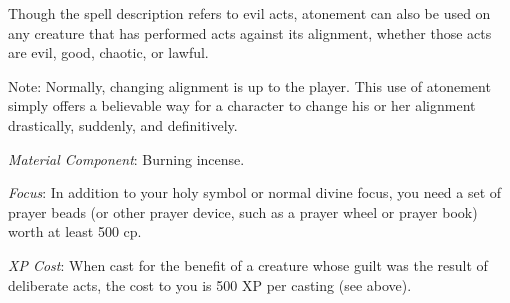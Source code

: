 {	Though the spell description refers to evil acts, atonement can also be used on any creature that has performed acts against its alignment, whether those acts are evil, good, chaotic, or lawful.

	Note: Normally, changing alignment is up to the player. This use of atonement simply offers a believable way for a character to change his or her alignment drastically, suddenly, and definitively.

	\textit{Material Component}:
	Burning incense.

	\textit{Focus}:
	In addition to your holy symbol or normal divine focus, you need a set of prayer beads (or other prayer device, such as a prayer wheel or prayer book) worth at least 500 cp.

	\textit{XP Cost}:
	When cast for the benefit of a creature whose guilt was the result of deliberate acts, the cost to you is 500 XP per casting (see above).

}
